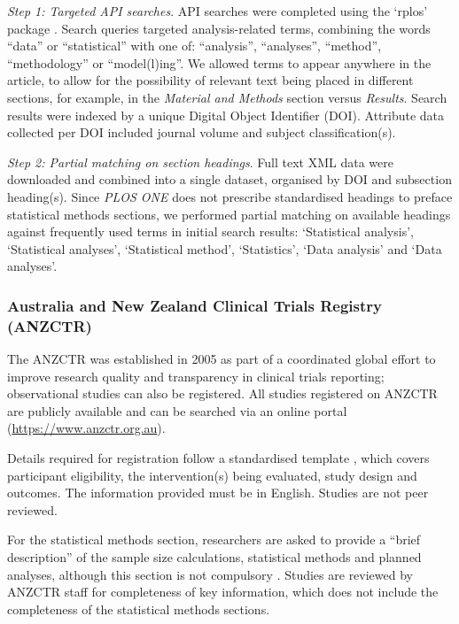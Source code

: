 \documentclass[12pt]{article}
\begin{document}
\emph{Step 1: Targeted API searches}. API searches were completed using
the `rplos' package \citep{rplos}. Search queries targeted analysis-related terms, combining 
the words ``data'' or ``statistical'' with one of:
``analysis'', ``analyses'', ``method'', ``methodology'' or
``model(l)ing''. We allowed terms to appear anywhere in the article, to allow for the possibility of relevant text being placed in different
sections, for example, in the \emph{Material and Methods} section versus
\emph{Results}. Search results were indexed by a unique Digital Object
Identifier (DOI). Attribute data collected per DOI included journal
volume and subject classification(s).

\emph{Step 2: Partial matching on section headings}. Full text XML data
were downloaded and combined into a single dataset, organised by DOI and
subsection heading(s). Since \emph{PLOS ONE} does not prescribe
standardised headings to preface statistical methods sections, we
performed partial matching on available headings against frequently used
terms in initial search results: `Statistical analysis', `Statistical
analyses', `Statistical method', `Statistics', `Data analysis' and `Data
analyses'.

\subsubsection{Australia and New Zealand Clinical Trials Registry (ANZCTR)}
\label{sec:methodsANZCTR}

The ANZCTR was established in 2005 as part of a coordinated global
effort to improve research quality and transparency in clinical trials
reporting; observational studies can also be registered. All studies
registered on ANZCTR are publicly available and can be searched via an
online portal (\url{https://www.anzctr.org.au}).

Details required for registration follow a standardised template
\citep{ANZCTR}, which covers participant eligibility, the
intervention(s) being evaluated, study design and outcomes. The
information provided must be in English. Studies are not peer reviewed.

For the statistical methods section, researchers are asked to provide a
``brief description'' of the sample size calculations, statistical
methods and planned analyses, although this section is not compulsory
\citep{ANZCTR}. Studies are reviewed by ANZCTR staff for completeness of
key information, which does not include the completeness of the
statistical methods sections.
\end{document}
